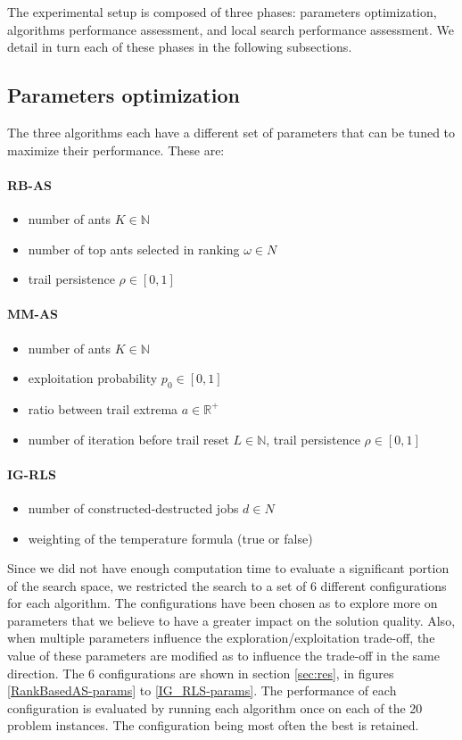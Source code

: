 \documentclass[runningheads]{llncs}
\begin{document}
The experimental setup is composed of three phases: parameters optimization,
algorithms performance assessment, and local search performance assessment.
We detail in turn each of these phases in the following subsections.

\subsection{Parameters optimization}

The three algorithms each have a different set of parameters that can be tuned
to maximize their performance. These are:

\paragraph{RB-AS}
\begin{itemize}
	\item number of ants $K\in\mathbb{N}$
	\item number of top ants selected in ranking $\omega\in N$
	\item trail persistence $\rho\in[0,1]$
\end{itemize}

\paragraph{MM-AS}
\begin{itemize}
	\item number of ants $K\in\mathbb{N}$
	\item exploitation probability $p_0\in[0,1]$
	\item ratio between trail extrema $a\in\mathbb{R^+}$
	\item number of iteration before trail reset $L\in\mathbb{N}$, trail
	persistence $\rho\in[0,1]$
\end{itemize}

\paragraph{IG-RLS}
\begin{itemize}
	\item number of constructed-destructed jobs $d\in N$
	\item weighting of the temperature formula (true or false)
\end{itemize}

Since we did not have enough computation time to evaluate a significant portion
of the search space, we restricted the search to a set of 6 different
configurations for each algorithm. The configurations have been chosen as to
explore more on parameters that we believe to have a greater impact on the
solution quality. Also, when multiple parameters influence the
exploration/exploitation trade-off, the value of these parameters are modified
as to influence the trade-off in the same direction. The 6 configurations are
shown in section \ref{sec:res}, in figures \ref{RankBasedAS-params} to
\ref{IG_RLS-params}. The performance of each configuration is evaluated by
running each algorithm once on each of the 20 problem instances. The
configuration being most often the best is retained.
\end{document}
